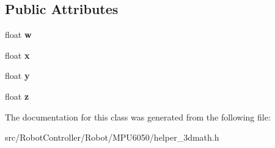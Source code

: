 \subsection*{Public Attributes}
\begin{DoxyCompactItemize}
\item 
\hypertarget{class_quaternion_aa44a65ab99e36f6ab8771030eed8a7ad}{float {\bfseries w}}\label{class_quaternion_aa44a65ab99e36f6ab8771030eed8a7ad}

\item 
\hypertarget{class_quaternion_a8b80f191a3155cc0158d2b4f4d50b2cb}{float {\bfseries x}}\label{class_quaternion_a8b80f191a3155cc0158d2b4f4d50b2cb}

\item 
\hypertarget{class_quaternion_a3bd3f270462944423611f44e19d2511b}{float {\bfseries y}}\label{class_quaternion_a3bd3f270462944423611f44e19d2511b}

\item 
\hypertarget{class_quaternion_a625cb732d8ff3083e7852b86b736ab29}{float {\bfseries z}}\label{class_quaternion_a625cb732d8ff3083e7852b86b736ab29}

\end{DoxyCompactItemize}


The documentation for this class was generated from the following file\+:\begin{DoxyCompactItemize}
\item 
src/\+Robot\+Controller/\+Robot/\+M\+P\+U6050/helper\+\_\+3dmath.\+h\end{DoxyCompactItemize}
